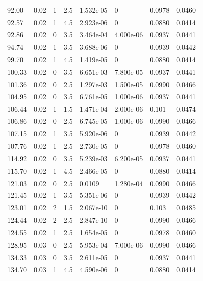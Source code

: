 \documentclass[preview]{standalone}
\begin{document}
{{{\begin{tabular}{L{1.2cm}C{1.2cm} C{0.3cm}C{0.5cm} C{1.4cm}C{1.4cm} C{1.4cm}C{1.4cm}}
  92.00  &  0.02  & 1     & 2.5 &  1.532e-05  & 0  & 0.0978 &  0.0460   \\ 
  92.57  &  0.02  & 1     & 4.5 &  2.923e-06  & 0  & 0.0880 &  0.0414   \\ 
  92.86  &  0.02  & 0     & 3.5 &  3.464e-04  & 4.000e-06  & 0.0937 &  0.0441   \\ 
  94.74  &  0.02  & 1     & 3.5 &  3.688e-06  & 0  & 0.0939 &  0.0442   \\ 
  99.70  &  0.02  & 1     & 4.5 &  1.419e-05  & 0  & 0.0880 &  0.0414   \\ 
  100.33  &  0.02  & 0     & 3.5 &  6.651e-03  & 7.800e-05  & 0.0937 &  0.0441   \\ 
  101.36  &  0.02  & 0     & 2.5 &  1.297e-03  & 1.500e-05  & 0.0990 &  0.0466   \\ 
  104.95  &  0.02  & 0     & 3.5 &  6.761e-05  & 1.000e-06  & 0.0937 &  0.0441   \\ 
  106.44  &  0.02  & 1     & 1.5 &  1.471e-04  & 2.000e-06  & 0.101 &  0.0474   \\ 
  106.86  &  0.02  & 0     & 2.5 &  6.745e-05  & 1.000e-06  & 0.0990 &  0.0466   \\ 
  107.15  &  0.02  & 1     & 3.5 &  5.920e-06  & 0  & 0.0939 &  0.0442   \\ 
  107.76  &  0.02  & 1     & 2.5 &  2.730e-05  & 0  & 0.0978 &  0.0460   \\ 
  114.92  &  0.02  & 0     & 3.5 &  5.239e-03  & 6.200e-05  & 0.0937 &  0.0441   \\ 
  115.70  &  0.02  & 1     & 4.5 &  2.466e-05  & 0  & 0.0880 &  0.0414   \\ 
  121.03  &  0.02  & 0     & 2.5 &  0.0109  & 1.280e-04  & 0.0990 &  0.0466   \\ 
  121.45  &  0.02  & 1     & 3.5 &  5.351e-06  & 0  & 0.0939 &  0.0442   \\ 
  123.01  &  0.02  & 2     & 1.5 &  2.067e-10  & 0  & 0.103 &  0.0485   \\ 
  124.44  &  0.02  & 2     & 2.5 &  2.847e-10  & 0  & 0.0990 &  0.0466   \\ 
  124.55  &  0.02  & 1     & 2.5 &  1.654e-05  & 0  & 0.0978 &  0.0460   \\ 
  128.95  &  0.03  & 0     & 2.5 &  5.953e-04  & 7.000e-06  & 0.0990 &  0.0466   \\ 
  134.33  &  0.03  & 0     & 3.5 &  2.611e-05  & 0  & 0.0937 &  0.0441   \\ 
  134.70  &  0.03  & 1     & 4.5 &  4.590e-06  & 0  & 0.0880 &  0.0414   \\ 

\end{tabular}}}}
\end{document}
